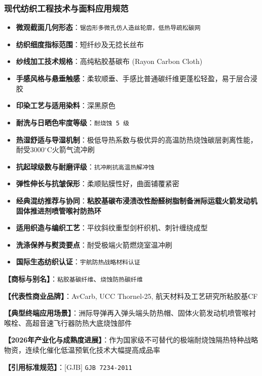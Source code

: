 \documentclass[11pt,openright,twoside,UTF8]{ctexbook}
\begin{document}
\subsubsection*{现代纺织工程技术与面料应用规范}
\begin{itemize} \setlength{\itemsep}{2pt}
    \item \textbf{微观截面几何形态}：\texttt{锯齿形多微孔仿人造丝轮廓，低热导疏松碳网}
    \item \textbf{纺织细度指标范围}：短纤纱及无捻长丝布
    \item \textbf{纱线加工技术规格}：高纯粘胶基碳布 (Rayon Carbon Cloth)
    \item \textbf{手感风格与悬垂触感}：柔软顺垂、手感比普通碳纤维更蓬松轻盈，易于层合浸胶
    \item \textbf{印染工艺与适用染料}：深黑原色
    \item \textbf{耐洗与日晒色牢度等级}：\texttt{耐烧蚀 5 级}
    \item \textbf{热湿舒适与导湿机制}：极低导热系数与极优异的高温防热烧蚀碳层剥离性能，耐受3000$^\circ\mathrm{C}$火箭气流冲刷
    \item \textbf{抗起球级数与耐磨评级}：\texttt{抗冲刷抗高温热解冲蚀}
    \item \textbf{弹性伸长与抗皱保形}：柔顺贴膜性好，曲面铺覆紧密
    \item \textbf{经典混纺推荐与协同}：\textbf{粘胶基碳布浸渍改性酚醛树脂制备洲际运载火箭发动机固体推进剂喷管喉衬防热环}
    \item \textbf{适用织造与编织工艺}：平纹斜纹重型剑杆织机、刺针缠绕成型
    \item \textbf{洗涤保养与熨烫要点}：耐受极端火箭燃烧室温冲刷
    \item \textbf{国际生态纺织认证}：\texttt{宇航防热战略材料认证}
\end{itemize}
\vspace{0.2cm}

\noindent\textbf{【商标与别名】}：\texttt{粘胶基碳纤维}、\texttt{烧蚀防热碳纤维}\par
\noindent\textbf{【代表性商业品牌】}：AvCarb, UCC Thornel-25, 航天材料及工艺研究所粘胶基CF\par
\noindent\textbf{【典型终端应用场景】}：洲际导弹再入弹头端头防热帽、固体火箭发动机喷管喉衬喉栓、高超音速飞行器防热大底烧蚀部件\par
\noindent\textbf{【2026年产业化与成熟度进展】}：作为国家级不可替代的极端耐烧蚀隔热特种战略物资，连续化催化低温预氧化技术大幅提高成品率\par
\noindent\textbf{【引用标准规范】}：[GJB] \texttt{GJB 7234-2011}\par
\vspace{0.5cm}
\end{document}
